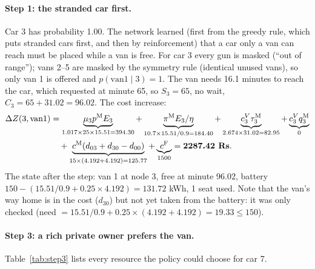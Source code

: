 \paragraph{Step 1: the stranded car first.} Car 3 has probability 1.00. The network learned (first from the greedy rule, which puts stranded cars first, and then by reinforcement) that a car only a van can reach must be placed while a van is free. For car 3 every gun is masked (``out of range''); vans 2--5 are masked by the symmetry rule (identical unused vans), so only van 1 is offered and $p(\text{van1}\mid3)=1$. The van needs 16.1 minutes to reach the car, which requested at minute 65, so $S_3=65$, no wait, $C_3=65+31.02=96.02$. The cost increase:
\[
\begin{aligned}
\Delta Z(3,\text{van1})&=\underbrace{\mu_3p^{\mathrm{M}} E_3}_{1.017\times25\times15.51=394.30}+\underbrace{\pi^{\mathrm{M}} E_3/\eta}_{10.7\times15.51/0.9=184.40}+\underbrace{c^V_3\tau^{\mathrm{M}}_3}_{2.674\times31.02=82.95}+\underbrace{c^V_3q^{\mathrm{M}}_3}_{0}\\
&\quad+\underbrace{c^{\mathrm{M}}(d_{03}+d_{30}-d_{00})}_{15\times(4.192+4.192)=125.77}+\underbrace{c^{\mathrm{F}}}_{1500}=\textbf{2287.42 Rs}.
\end{aligned}
\]
The state after the step: van 1 at node 3, free at minute 96.02, battery $150-(15.51/0.9+0.25\times4.192)=131.72$ kWh, 1 seat used. Note that the van's way home is in the cost ($d_{30}$) but not yet taken from the battery: it was only checked (need $=15.51/0.9+0.25\times(4.192+4.192)=19.33\le150$).

\paragraph{Step 3: a rich private owner prefers the van.} Table~\ref{tab:step3} lists every resource the policy could choose for car 7.

\begin{table}[H]
\centering
\caption{Step 3, car 7: every resource, why it is masked or allowed, its start, wait, finish, cost increase and the policy's probability. Gun 2 of a station is listed only when it is not masked by the symmetry rule (at FCS6, gun 1 is busy until minute 59.5, so the two guns differ and both are offered).}
\label{tab:step3}

\end{table}

